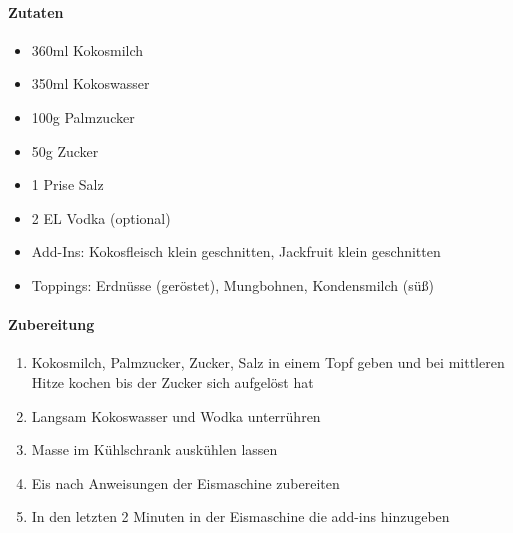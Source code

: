 \newpage
{}
\paragraph{Zutaten}
\begin{itemize}[noitemsep]
	\item 360ml Kokosmilch 
	\item 350ml Kokoswasser
	\item 100g Palmzucker
	\item 50g Zucker
	\item 1 Prise Salz
	\item 2 EL Vodka (optional)
	\item Add-Ins: Kokosfleisch klein geschnitten, Jackfruit klein geschnitten
	\item Toppings: Erdnüsse (geröstet), Mungbohnen, Kondensmilch (süß)
\end{itemize}
\paragraph{Zubereitung}
\begin{enumerate}[noitemsep]
	\item Kokosmilch, Palmzucker, Zucker, Salz in einem Topf geben und bei mittleren Hitze kochen bis der Zucker sich aufgelöst hat
	\item Langsam Kokoswasser und Wodka unterrühren
	\item Masse im Kühlschrank auskühlen lassen
	\item Eis nach Anweisungen der Eismaschine zubereiten 
	\item In den letzten 2 Minuten in der Eismaschine die add-ins hinzugeben
\end{enumerate}